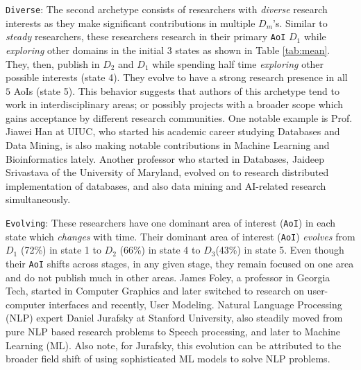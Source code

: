 \documentclass[10pt,letterpaper]{article}
\begin{document}
\texttt{Diverse}: The second archetype consists of researchers with \emph{diverse} research interests as they make significant contributions in multiple $D_m$'s. Similar to \emph{steady} researchers, these researchers research in their primary \texttt{AoI} $D_1$ while \emph{exploring} other domains in the initial $3$ states as shown in Table \ref{tab:mean}. They, then, publish in $D_2$ and $D_1$ while spending half time \emph{exploring} other possible interests (state 4). They evolve to have a strong research presence in all $5$ AoIs (state 5). This behavior suggests that authors of this archetype tend to work in interdisciplinary areas; or possibly projects with a broader scope which gains acceptance by different research communities.
One notable example is Prof. Jiawei Han at UIUC, who started his academic career studying Databases and Data Mining, is also making notable contributions in Machine Learning and Bioinformatics lately.
Another professor who started in Databases, Jaideep Srivastava of the University of Maryland, evolved on to research distributed implementation of databases, and also data mining and AI-related research simultaneously.

\texttt{Evolving}: These researchers have one dominant area of interest (\texttt{AoI}) in each state which \emph{changes} with time. Their dominant  area of interest (\texttt{AoI}) \emph{evolves} from $D_1$ (72\%) in state 1 to $D_2$ (66\%) in state 4 to $D_3$(43\%) in state 5. Even though their \texttt{AoI} shifts across stages, in any given stage, they remain focused on one area and do not publish much in other areas.
James Foley, a professor in Georgia Tech, started in Computer Graphics and later switched to research on user-computer interfaces and recently, User Modeling.
Natural Language Processing (NLP) expert Daniel Jurafsky at Stanford University, also steadily moved from pure NLP based research problems to Speech processing, and later to Machine Learning (ML). Also note, for Jurafsky, this evolution can be attributed to the broader field shift of using sophisticated ML models to solve NLP problems.
\end{document}
